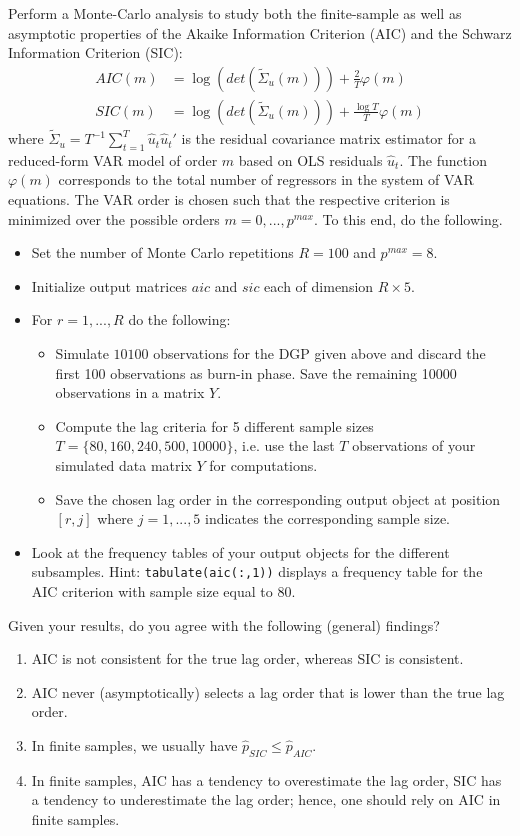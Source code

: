 \documentclass{article}
\begin{document}
Perform a Monte-Carlo analysis to study both the finite-sample as well as asymptotic properties of the Akaike Information Criterion (AIC) and the Schwarz Information Criterion (SIC):
\begin{align*}
AIC(m)  &= \log(det(\tilde{\Sigma}_u(m))) + \frac{2}{T}\varphi(m)\\
SIC(m)  &= \log(det(\tilde{\Sigma}_u(m))) + \frac{\log T}{T}\varphi(m)
\end{align*}
where $\tilde{\Sigma}_u=T^{-1}\sum_{t=1}^T \hat{u}_t\hat{u}_t'$ is the residual covariance matrix estimator for a reduced-form VAR model of order $m$ based on OLS residuals $\hat{u}_t$. The function $\varphi(m)$ corresponds to the total number of regressors in the system of VAR equations. The VAR order is chosen such that the respective criterion is minimized over the possible orders $m = 0,...,p^{max}$. To this end, do the following.

\begin{itemize}
	\item Set the number of Monte Carlo repetitions $R=100$ and $p^{max}=8$.
	\item Initialize output matrices $aic$ and $sic$ each of dimension $R \times 5$. 
	\item For $r=1,...,R$ do the following:
	\begin{itemize}
		\item Simulate $10100$ observations for the DGP given above and discard the first 100 observations as burn-in phase. Save the remaining 10000 observations in a matrix $Y$.
		\item Compute the lag criteria for 5 different sample sizes $T=\{80, 160, 240, 500, 10000\}$, i.e. use the last $T$ observations of your simulated data matrix $Y$ for computations.
		\item Save the chosen lag order in the corresponding output object at position $[r,j]$ where $j=1,...,5$ indicates the corresponding sample size.
	\end{itemize}
	\item Look at the frequency tables of your output objects for the different subsamples. Hint: \texttt{tabulate(aic(:,1))} displays a frequency table for the AIC criterion with sample size equal to 80.
\end{itemize}
Given your results, do you agree with the following (general) findings?
\begin{enumerate}
	\item AIC is not consistent for the true lag order, whereas SIC is consistent.
	\item AIC never (asymptotically) selects a lag order that is lower than the true lag order.
	\item In finite samples, we usually have $\hat{p}_{SIC} \leq \hat{p}_{AIC}$.
	\item In finite samples, AIC has a tendency to overestimate the lag order, SIC has a tendency to underestimate the lag order; hence, one should rely on AIC in finite samples.
\end{enumerate}
\end{document}
